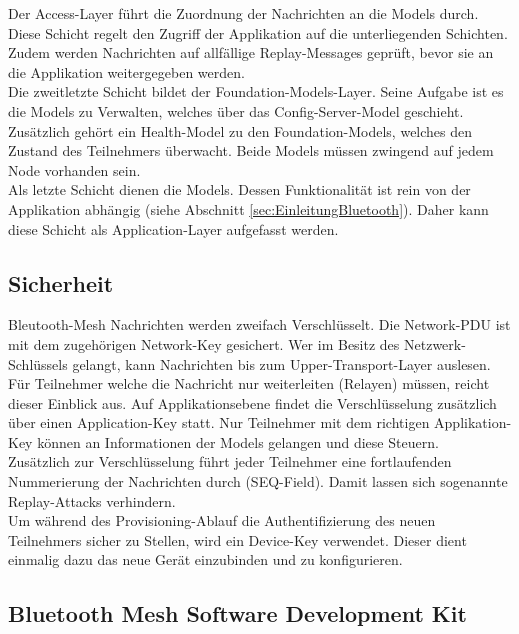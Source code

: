 Der Access-Layer führt die Zuordnung der Nachrichten an die Models durch. Diese Schicht regelt den Zugriff der Applikation auf die unterliegenden Schichten. Zudem werden Nachrichten auf allfällige Replay-Messages geprüft, bevor sie an die Applikation weitergegeben werden. \\

Die zweitletzte Schicht bildet der Foundation-Models-Layer. Seine Aufgabe ist es die Models zu Verwalten, welches über das Config-Server-Model geschieht. Zusätzlich gehört ein Health-Model zu den Foundation-Models, welches den Zustand des Teilnehmers überwacht. Beide Models müssen zwingend auf jedem Node vorhanden sein. \cite{bluetooth_sig_mesh_netzwerk_spezifikationen_2020} \cite{bluetooth_sig_mesh-technology-overviewpdf_2020}  \\

Als letzte Schicht dienen die Models. Dessen Funktionalität ist rein von der Applikation abhängig (siehe Abschnitt \ref{sec:EinleitungBluetooth}). Daher kann diese Schicht als Application-Layer aufgefasst werden.  \\


\subsection{Sicherheit}\label{subsec:BleutoothMeshSicherheit}
Bleutooth-Mesh Nachrichten werden zweifach Verschlüsselt. Die Network-PDU ist mit dem zugehörigen Network-Key gesichert. Wer im Besitz des Netzwerk-Schlüssels gelangt, kann Nachrichten bis zum Upper-Transport-Layer auslesen. Für Teilnehmer welche die Nachricht nur weiterleiten (Relayen) müssen, reicht dieser Einblick aus. Auf Applikationsebene findet die Verschlüsselung zusätzlich über einen Application-Key statt. Nur Teilnehmer mit dem richtigen Applikation-Key können an Informationen der Models gelangen und diese Steuern. \\

Zusätzlich zur Verschlüsselung führt jeder Teilnehmer eine fortlaufenden Nummerierung der Nachrichten durch (SEQ-Field). Damit lassen sich sogenannte Replay-Attacks verhindern. \\

Um während des Provisioning-Ablauf die Authentifizierung des neuen Teilnehmers sicher zu Stellen, wird ein Device-Key verwendet. Dieser dient einmalig dazu das neue Gerät einzubinden und zu konfigurieren. 



\subsection{Bluetooth Mesh Software Development Kit}\label{sec:BluetoothMeshSoftwareDevelopmentKit}

